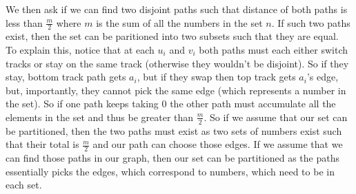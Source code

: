 \documentclass[12pt]{article}
\begin{document}

We then ask if we can find two disjoint paths such that distance of both paths is less than $\frac{m}{2}$ where $m$ is the sum of all the numbers in the set $n$.  If such two paths exist, then the set can be paritioned into two subsets such that they are equal.\\
To explain this, notice that at each $u_i$ and $v_i$ both paths must each either switch tracks or stay on the same track  (otherwise they wouldn't be disjoint).  So if they stay, bottom track path gets $a_i$, but if they swap then top track gets $a_i$'s edge, but, importantly, they cannot pick the same edge (which represents a number in the set).  So if one path keeps taking $0$ the other path must accumulate all the elements in the set and thus be greater than $\frac{m}{2}$.  So if we assume that our set can be partitioned, then the two paths must exist as two sets of numbers exist such that their total is $\frac{m}{2}$ and our path can choose those edges.  If we assume that we can find those paths in our graph, then our set can be partitioned as the paths essentially picks the edges, which correspond to numbers, which need to be in each set.  
\end{document}
